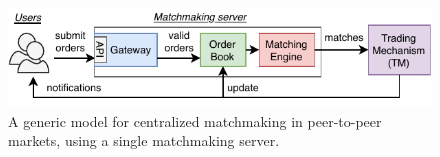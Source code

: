 



\begin{figure}[t]
	\centering
	\includegraphics[width=\linewidth]{match/assets/central_exchange_architecture}
	\caption{A generic model for centralized matchmaking in peer-to-peer markets, using a single matchmaking server.}
	\label{fig:central_exchange_architecture}
\end{figure}

